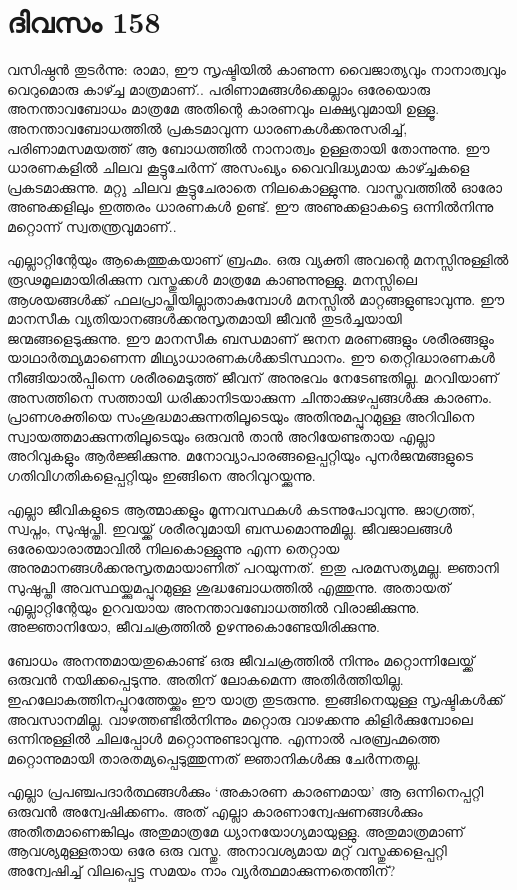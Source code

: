 \section{ദിവസം 158}


വസിഷ്ഠൻ തുടർന്നു: രാമാ, ഈ സൃഷ്ടിയിൽ കാണുന്ന വൈജാത്യവും നാനാത്വവും വെറുമൊരു കാഴ്ച്ച മാത്രമാണ്‌.. പരിണാമങ്ങൾക്കെല്ലാം ഒരേയൊരു അനന്താവബോധം മാത്രമേ അതിന്റെ കാരണവും ലക്ഷ്യവുമായി ഉള്ളൂ. അനന്താവബോധത്തിൽ പ്രകടമാവുന്ന ധാരണകൾക്കനുസരിച്ച്, പരിണാമസമയത്ത് ആ ബോധത്തിൽ നാനാത്വം ഉള്ളതായി തോന്നുന്നു. ഈ ധാരണകളിൽ ചിലവ കൂട്ടുചേർന്ന് അസംഖ്യം വൈവിദ്ധ്യമായ കാഴ്ച്ചകളെ പ്രകടമാക്കുന്നു. മറ്റു ചിലവ കൂട്ടുചേരാതെ നിലകൊള്ളുന്നു. വാസ്തവത്തിൽ ഓരോ അണുക്കളിലും ഇത്തരം ധാരണകൾ ഉണ്ട്. ഈ അണുക്കളാകട്ടെ ഒന്നിൽനിന്നു മറ്റൊന്ന് സ്വതന്ത്രവുമാണ്‌..

എല്ലാറ്റിന്റേയും ആകെത്തുകയാണ്‌ ബ്രഹ്മം. ഒരു വ്യക്തി അവന്റെ മനസ്സിനുള്ളിൽ രൂഢമൂലമായിരിക്കുന്ന വസ്തുക്കൾ മാത്രമേ കാണുന്നുള്ളു. മനസ്സിലെ ആശയങ്ങള്‍ക്ക് ഫലപ്രാപ്തിയില്ലാതാകുമ്പോൾ മനസ്സിൽ മാറ്റങ്ങളുണ്ടാവുന്നു. ഈ മാനസീക വ്യതിയാനങ്ങൾക്കനുസൃതമായി  ജീവന്‍ തുടർച്ചയായി ജന്മങ്ങളെടുക്കുന്നു. ഈ മാനസീക ബന്ധമാണ്‌ ജനന മരണങ്ങളും ശരീരങ്ങളും യാഥാർത്ഥ്യമാണെന്ന മിഥ്യാധാരണകൾക്കടിസ്ഥാനം. ഈ തെറ്റിദ്ധാരണകൾ നീങ്ങിയാൽപ്പിന്നെ ശരീരമെടുത്ത് ജീവന്‌ അനുഭവം നേടേണ്ടതില്ല. മറവിയാണ്‌ അസത്തിനെ സത്തായി ധരിക്കാനിടയാക്കുന്ന ചിന്താക്കുഴപ്പങ്ങൾക്കു കാരണം. പ്രാണശക്തിയെ സംശുദ്ധമാക്കുന്നതിലൂടെയും അതിനുമപ്പുറമുള്ള അറിവിനെ സ്വായത്തമാക്കുന്നതിലൂടെയും ഒരുവൻ താൻ അറിയേണ്ടതായ എല്ലാ അറിവുകളും ആർജ്ജിക്കുന്നു. മനോവ്യാപാരങ്ങളെപ്പറ്റിയും പുനർജന്മങ്ങളുടെ ഗതിവിഗതികളെപ്പറ്റിയും ഇങ്ങിനെ അറിവുറയ്ക്കുന്നു.

എല്ലാ ജീവികളുടെ ആത്മാക്കളും മൂന്നവസ്ഥകൾ കടന്നുപോവുന്നു. ജാഗ്രത്ത്, സ്വപ്നം, സുഷുപ്തി. ഇവയ്ക്ക് ശരീരവുമായി ബന്ധമൊന്നുമില്ല. ജീവജാലങ്ങൾ ഒരേയൊരാത്മാവിൽ നിലകൊള്ളുന്നു എന്ന തെറ്റായ അനുമാനങ്ങൾക്കനുസൃതമായാണിത് പറയുന്നത്. ഇതു പരമസത്യമല്ല. ജ്ഞാനി സുഷുപ്തി അവസ്ഥയ്ക്കുമപ്പുറമുള്ള ശുദ്ധബോധത്തിൽ എത്തുന്നു. അതായത് എല്ലാറ്റിന്റേയും ഉറവയായ അനന്താവബോധത്തിൽ വിരാജിക്കുന്നു. അജ്ഞാനിയോ, ജീവചക്രത്തിൽ ഉഴന്നുകൊണ്ടേയിരിക്കുന്നു.

ബോധം അനന്തമായതുകൊണ്ട് ഒരു ജീവചക്രത്തിൽ നിന്നും മറ്റൊന്നിലേയ്ക്ക് ഒരുവൻ നയിക്കപ്പെടുന്നു. അതിന്‌ ലോകമെന്ന അതിർത്തിയില്ല. ഇഹലോകത്തിനപ്പുറത്തേയ്ക്കും ഈ യാത്ര തുടരുന്നു. ഇങ്ങിനെയുള്ള സൃഷ്ടികൾക്ക് അവസാനമില്ല. വാഴത്തണ്ടിൽനിന്നും മറ്റൊരു വാഴക്കന്നു കിളിർക്കുമ്പോലെ ഒന്നിനുള്ളിൽ ചിലപ്പോൾ മറ്റൊന്നുണ്ടാവുന്നു. എന്നാൽ പരബ്രഹ്മത്തെ മറ്റൊന്നുമായി താരതമ്യപ്പെടുത്തുന്നത് ജ്ഞാനികൾക്കു ചേർന്നതല്ല.

എല്ലാ പ്രപഞ്ചപദാർത്ഥങ്ങൾക്കും ‘അകാരണ കാരണമായ’ ആ ഒന്നിനെപ്പറ്റി ഒരുവൻ അന്വേഷിക്കണം. അത് എല്ലാ കാരണാന്വേഷണങ്ങൾക്കും അതീതമാണെങ്കിലും അതുമാത്രമേ ധ്യാനയോഗ്യമായുള്ളു. അതുമാത്രമാണ്‌ ആവശ്യമുള്ളതായ ഒരേ ഒരു വസ്തു. അനാവശ്യമായ മറ്റ് വസ്തുക്കളെപ്പറ്റി അന്വേഷിച്ച് വിലപ്പെട്ട സമയം നാം വ്യർത്ഥമാക്കുന്നതെന്തിന്‌? 
